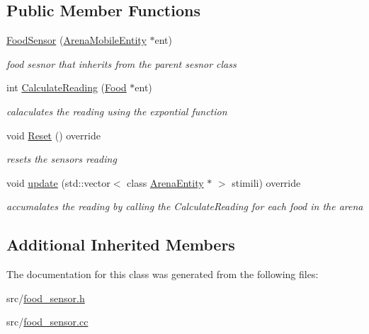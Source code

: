 \subsection*{Public Member Functions}
\begin{DoxyCompactItemize}
\item 
\hyperlink{class_food_sensor_a69a35d7061b547ef3140aa03d889b749}{Food\+Sensor} (\hyperlink{class_arena_mobile_entity}{Arena\+Mobile\+Entity} $\ast$ent)\hypertarget{class_food_sensor_a69a35d7061b547ef3140aa03d889b749}{}\label{class_food_sensor_a69a35d7061b547ef3140aa03d889b749}

\begin{DoxyCompactList}\small\item\em food sesnor that inherits from the parent sesnor class \end{DoxyCompactList}\item 
int \hyperlink{class_food_sensor_a76e0a85b68b3fb3983d25c43673f37b7}{Calculate\+Reading} (\hyperlink{class_food}{Food} $\ast$ent)\hypertarget{class_food_sensor_a76e0a85b68b3fb3983d25c43673f37b7}{}\label{class_food_sensor_a76e0a85b68b3fb3983d25c43673f37b7}

\begin{DoxyCompactList}\small\item\em calaculates the reading using the expontial function \end{DoxyCompactList}\item 
void \hyperlink{class_food_sensor_a1b60ca32e66f68f2ca7ddd1d6d709764}{Reset} () override\hypertarget{class_food_sensor_a1b60ca32e66f68f2ca7ddd1d6d709764}{}\label{class_food_sensor_a1b60ca32e66f68f2ca7ddd1d6d709764}

\begin{DoxyCompactList}\small\item\em resets the sensors reading \end{DoxyCompactList}\item 
void \hyperlink{class_food_sensor_a9faf073eb425b425846a54cf502a7702}{update} (std\+::vector$<$ class \hyperlink{class_arena_entity}{Arena\+Entity} $\ast$ $>$ stimili) override\hypertarget{class_food_sensor_a9faf073eb425b425846a54cf502a7702}{}\label{class_food_sensor_a9faf073eb425b425846a54cf502a7702}

\begin{DoxyCompactList}\small\item\em accumalates the reading by calling the Calculate\+Reading for each food in the arena \end{DoxyCompactList}\end{DoxyCompactItemize}
\subsection*{Additional Inherited Members}


The documentation for this class was generated from the following files\+:\begin{DoxyCompactItemize}
\item 
src/\hyperlink{food__sensor_8h}{food\+\_\+sensor.\+h}\item 
src/\hyperlink{food__sensor_8cc}{food\+\_\+sensor.\+cc}\end{DoxyCompactItemize}
